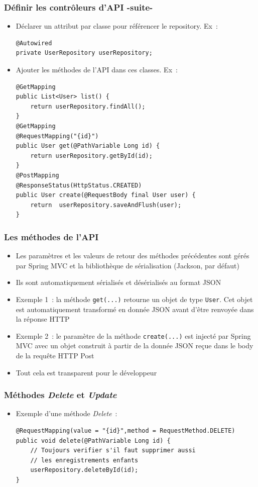 \documentclass{beamer}
\begin{document}
\begin{frame}[fragile]
	\frametitle{Définir les contrôleurs d'API -suite-}
	\begin{itemize}
		\item Déclarer un attribut par classe pour référencer le repository. Ex~:
\begin{lstlisting}
@Autowired
private UserRepository userRepository;
\end{lstlisting}
		
		\item Ajouter les méthodes de l'API dans ces classes. Ex~:
\begin{lstlisting}
@GetMapping
public List<User> list() {
	return userRepository.findAll();
}
@GetMapping
@RequestMapping("{id}")
public User get(@PathVariable Long id) {
	return userRepository.getById(id);
}
@PostMapping
@ResponseStatus(HttpStatus.CREATED)
public User create(@RequestBody final User user) {
	return  userRepository.saveAndFlush(user);
}
\end{lstlisting}
		
	\end{itemize}
\end{frame}

\begin{frame}[fragile]
	\frametitle{Les méthodes de l'API}
	\begin{itemize}
		\item Les paramètres et les valeurs de retour des méthodes précédentes sont gérés par Spring MVC et la bibliothèque de sérialisation (Jackson, par défaut)
		\item Ils sont automatiquement sérialisés et désérialisés au format JSON
		\item Exemple 1~: la méthode \texttt{get(...)} retourne un objet de type \texttt{User}.  Cet objet est automatiquement transformé en donnée JSON avant d'être renvoyée dans la réponse HTTP
		\item Exemple 2~: le paramètre de la méthode \texttt{create(...)} est injecté par Spring MVC avec un objet construit à partir de la donnée JSON reçue dans le body de la requête HTTP Post
		\item Tout cela est transparent pour le développeur
	\end{itemize}
\end{frame} 

\begin{frame}[fragile]
	\frametitle{Méthodes \textit{Delete} et \textit{Update}}
	\begin{itemize}
		\item Exemple d'une méthode \textit{Delete}~:
\begin{lstlisting}
@RequestMapping(value = "{id}",method = RequestMethod.DELETE)
public void delete(@PathVariable Long id) {
	// Toujours verifier s'il faut supprimer aussi 
	// les enregistrements enfants
	userRepository.deleteById(id);
}
\end{lstlisting}	
\end{itemize}
\end{frame} 
\end{document}
